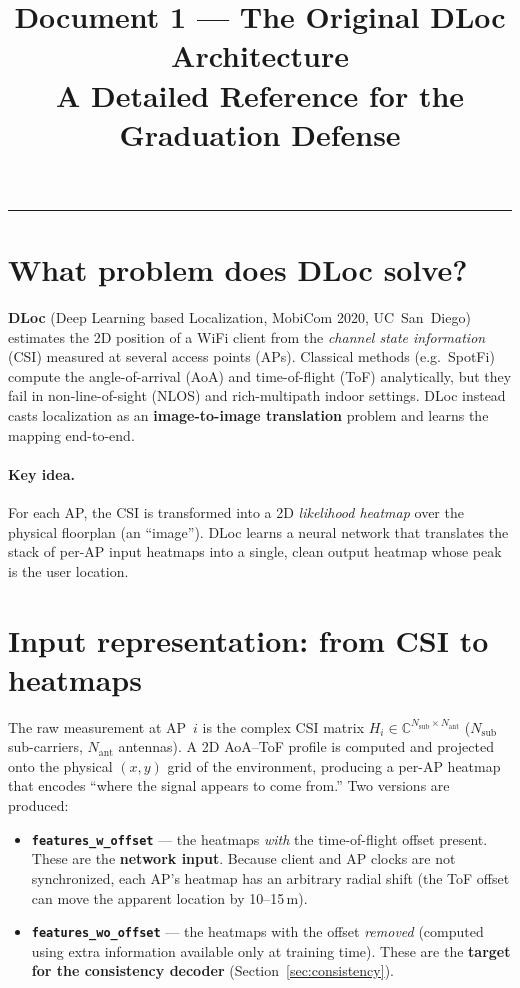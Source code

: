 \documentclass[11pt,a4paper]{article}
\title{\vspace{-1.5em}\textbf{Document 1 --- The Original DLoc Architecture}\\
\large A Detailed Reference for the Graduation Defense}
\author{}
\date{}
\begin{document}
\maketitle
\tableofcontents
\vspace{1em}\hrule\vspace{1em}

\section{What problem does DLoc solve?}

\textbf{DLoc} (Deep Learning based Localization, MobiCom 2020, UC~San~Diego) estimates the 2D
position of a WiFi client from the \emph{channel state information} (CSI) measured at several
access points (APs). Classical methods (e.g.\ SpotFi) compute the angle-of-arrival (AoA) and
time-of-flight (ToF) analytically, but they fail in non-line-of-sight (NLOS) and rich-multipath
indoor settings. DLoc instead casts localization as an \textbf{image-to-image translation}
problem and learns the mapping end-to-end.

\paragraph{Key idea.} For each AP, the CSI is transformed into a 2D \emph{likelihood heatmap}
over the physical floorplan (an ``image''). DLoc learns a neural network that translates the
stack of per-AP input heatmaps into a single, clean output heatmap whose peak is the user
location.

\section{Input representation: from CSI to heatmaps}

The raw measurement at AP~$i$ is the complex CSI matrix $H_i \in \mathbb{C}^{N_{\text{sub}}\times
N_{\text{ant}}}$ ($N_{\text{sub}}$ sub-carriers, $N_{\text{ant}}$ antennas). A 2D AoA--ToF
profile is computed and projected onto the physical $(x,y)$ grid of the environment, producing a
per-AP heatmap that encodes ``where the signal appears to come from.'' Two versions are produced:

\begin{itemize}[nosep]
  \item \textbf{\texttt{features\_w\_offset}} --- the heatmaps \emph{with} the time-of-flight
  offset present. These are the \textbf{network input}. Because client and AP clocks are not
  synchronized, each AP's heatmap has an arbitrary radial shift (the ToF offset can move the
  apparent location by 10--15\,m).
  \item \textbf{\texttt{features\_wo\_offset}} --- the heatmaps with the offset \emph{removed}
  (computed using extra information available only at training time). These are the
  \textbf{target for the consistency decoder} (Section~\ref{sec:consistency}).
\end{itemize}
\end{document}
